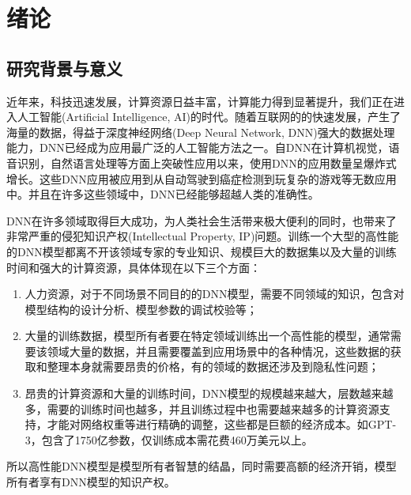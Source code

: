 
\chapter{绪论}
\label{1}


\section{研究背景与意义}

近年来，科技迅速发展，计算资源日益丰富，计算能力得到显著提升，我们正在进入人工智能(Artificial Intelligence, AI)\cite{winston1984artificial}的时代。随着互联网的的快速发展，产生了海量的数据，得益于深度神经网络(Deep Neural Network, DNN)\cite{sze2017efficient}强大的数据处理能力，DNN已经成为应用最广泛的人工智能方法之一。自DNN在计算机视觉\cite{he2016identity,cortes2015advances,simonyan2014very}，语音识别\cite{nassif2019speech}，自然语言处理\cite{collobert2011natural,wu2016google,xiong2016achieving}等方面上突破性应用以来，使用DNN的应用数量呈爆炸式增长。这些DNN应用被应用到从自动驾驶\cite{chen2015deepdriving}到癌症检测\cite{esteva2017dermatologist}到玩复杂的游戏\cite{silver2017mastering}等无数应用中。并且在许多这些领域中，DNN已经能够超越人类的准确性。

DNN在许多领域取得巨大成功，为人类社会生活带来极大便利的同时，也带来了非常严重的侵犯知识产权(Intellectual Property, IP)问题。训练一个大型的高性能的DNN模型都离不开该领域专家的专业知识、规模巨大的数据集以及大量的训练时间和强大的计算资源，具体体现在以下三个方面：

\begin{enumerate}
	\renewcommand{\labelenumi}{\theenumi)}
	\item 人力资源，对于不同场景不同目的的DNN模型，需要不同领域的知识，包含对模型结构的设计分析、模型参数的调试校验等；
	\item 大量的训练数据，模型所有者要在特定领域训练出一个高性能的模型，通常需要该领域大量的数据，并且需要覆盖到应用场景中的各种情况，这些数据的获取和整理本身就需要昂贵的价格，有的领域的数据还涉及到隐私性问题；
	\item 昂贵的计算资源和大量的训练时间，DNN模型的规模越来越大，层数越来越多，需要的训练时间也越多，并且训练过程中也需要越来越多的计算资源支持，才能对网络权重等进行精确的调整，这些都是巨额的经济成本。如GPT-3\cite{brown2020language}，包含了1750亿参数，仅训练成本需花费460万美元以上。
\end{enumerate}

所以高性能DNN模型是模型所有者智慧的结晶，同时需要高额的经济开销，模型所有者享有DNN模型的知识产权\cite{chen2018performance,darvish2019deepsigns}。

